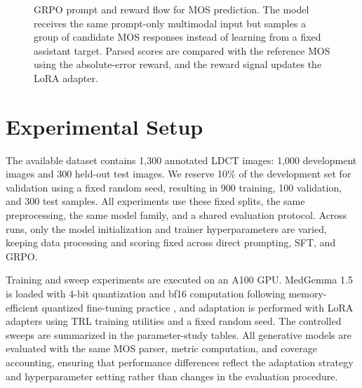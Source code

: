 \begin{figure}[t]
  \centering
  \resizebox{\textwidth}{!}{}
  \caption{GRPO prompt and reward flow for MOS prediction. The model receives the same prompt-only multimodal input but samples a group of candidate MOS responses instead of learning from a fixed assistant target. Parsed scores are compared with the reference MOS using the absolute-error reward, and the reward signal updates the LoRA adapter.}
  \label{fig:grpo-prompt-flow}
\end{figure}

\chapter{Experimental Setup}
The available dataset contains 1,300 annotated LDCT images: 1,000 development images and 300 held-out test images. We reserve 10\% of the development set for validation using a fixed random seed, resulting in 900 training, 100 validation, and 300 test samples. All experiments use these fixed splits, the same preprocessing, the same model family, and a shared evaluation protocol. Across runs, only the model initialization and trainer hyperparameters are varied, keeping data processing and scoring fixed across direct prompting, SFT, and GRPO.

Training and sweep experiments are executed on an A100 GPU. MedGemma 1.5 is loaded with 4-bit quantization and bf16 computation following memory-efficient quantized fine-tuning practice \cite{dettmers2023qlora}, and adaptation is performed with LoRA adapters using TRL training utilities \cite{trl} and a fixed random seed. The controlled sweeps are summarized in the parameter-study tables. All generative models are evaluated with the same MOS parser, metric computation, and coverage accounting, ensuring that performance differences reflect the adaptation strategy and hyperparameter setting rather than changes in the evaluation procedure.
